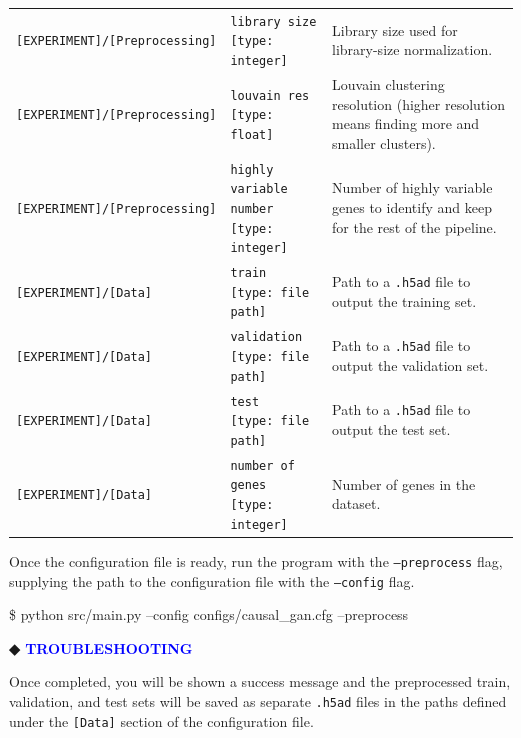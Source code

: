 \begin{tcolorbox}
\begin{table}[!t]
{\begin{tabular}{@{}llp{9cm}@{}}
        \addlinespace
        \texttt{[EXPERIMENT]/[Preprocessing]} & \makecell[l]{\texttt{library size} \\ \texttt{[type: integer]}} & Library size used for library-size normalization. \\
        \addlinespace
        \texttt{[EXPERIMENT]/[Preprocessing]} & \makecell[l]{\texttt{louvain res} \\ \texttt{[type: float]}} & Louvain clustering resolution (higher resolution means finding more and smaller clusters). \\
        \addlinespace
        \texttt{[EXPERIMENT]/[Preprocessing]} & \makecell[l]{\texttt{highly variable number} \\ \texttt{[type: integer]}} & Number of highly variable genes to identify and keep for the rest of the pipeline. \\
        \texttt{[EXPERIMENT]/[Data]} & \makecell[l]{\texttt{train} \\ \texttt{[type: file path]}} & Path to a \texttt{.h5ad} file to output the training set. \\
        \addlinespace
        \texttt{[EXPERIMENT]/[Data]} & \makecell[l]{\texttt{validation} \\ \texttt{[type: file path]}} & Path to a \texttt{.h5ad} file to output the validation set. \\
        \addlinespace
        \texttt{[EXPERIMENT]/[Data]} & \makecell[l]{\texttt{test} \\ \texttt{[type: file path]}} & Path to a \texttt{.h5ad} file to output the test set. \\
        \addlinespace
        \texttt{[EXPERIMENT]/[Data]} & \makecell[l]{\texttt{number of genes} \\ \texttt{[type: integer]}} & Number of genes in the dataset. \\
        \bottomrule
    \end{tabular}}
\end{table}

Once the configuration file is ready, run the program with the \texttt{--preprocess} flag, supplying
the path to the configuration file with the \texttt{--config} flag.
\begin{codeblock}
\$ python src/main.py --config configs/causal\_gan.cfg –preprocess
\end{codeblock}
\textbf{◆ \textcolor{blue}{TROUBLESHOOTING}}

Once completed, you will be shown a success message and the preprocessed train, validation,
and test sets will be saved as separate \texttt{.h5ad} files in the paths defined under the \texttt{[Data]} section
of the configuration file. 


\end{tcolorbox}

